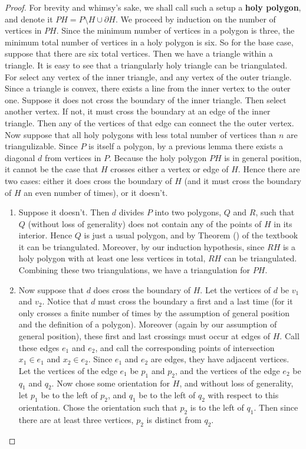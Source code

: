 \documentclass[12pt]{article}
\newcommand{\bndry}{\partial}
\theoremstyle{definition}
\begin{document}
\begin{proof} 
For brevity and whimsy's sake, we shall call such a setup a \textbf{holy polygon}, and denote it $PH = P\setminus H \cup \bndry H$. We proceed by induction on the number of vertices in $PH$. Since the minimum number of vertices in a polygon is three, the minimum total number of vertices in a holy polygon is six. So for the base case, suppose that there are six total vertices. Then we have a triangle within a triangle. It is easy to see that a triangularly holy triangle can be triangulated. For select any vertex of the inner triangle, and any vertex of the outer triangle. Since a triangle is convex, there exists a line from the inner vertex to the outer one. Suppose it does not cross the boundary of the inner triangle. Then select another vertex. If not, it must cross the boundary at an edge of the inner triangle. Then any of the vertices of that edge can connect the the outer vertex.    \\

Now suppose that all holy polygons with less total number of vertices than $n$ are triangulizable. Since $P$ is itself a polygon, by a previous lemma there exists a diagonal $d$ from vertices in $P$. Because the holy polygon $PH$ is in general position, it cannot be the case that $H$ crosses either a vertex or edge of $H$. Hence there are two cases: either it does cross the boundary of $H$ (and it must cross the boundary of $H$ an even number of times), or it doesn't. 

\begin{enumerate}
\item Suppose it doesn't. Then $d$ divides $P$ into two polygons, $Q$ and $R$, such that $Q$ (without loss of generality) does not contain any of the points
of $H$ in its interior. Hence $Q$ is just a usual polygon, and by Theorem () of the textbook it can be triangulated. Moreover, by our induction hypothesis, since $RH$ is a holy polygon with at least one less vertices in total, $RH$ can be triangulated. Combining these two triangulations, we have a triangulation for $PH$.

\item Now suppose that $d$ does cross the boundary of $H$. Let the vertices of $d$ be $v_1$ and $v_2$. Notice that $d$ must cross the boundary a first and a last time (for it only crosses a finite number of times by the assumption of general position and the definition of a polygon). Moreover (again by our assumption of general position), these first and last crossings must occur at edges of $H$. Call these edges $e_1$ and $e_2$, and  call the corresponding points of intersection $x_1\in e_1$ and $x_2\in e_2$. Since $e_1$ and $e_2$ are edges, they have adjacent vertices. Let the vertices of the edge $e_1$ be $p_1$ and $p_2$, and the vertices of the edge $e_2$ be $q_1$ and $q_2$. Now chose some orientation for $H$, and without loss of generality, let $p_1$ be to the left of $p_2$, and $q_1$ be to the left of $q_2$ with respect to this orientation. Chose the orientation such that $p_2$ is to the left of $q_1$. Then since there are at least three vertices, $p_2$ is distinct from $q_2$. \\


\end{enumerate}
\end{proof}
\end{document}
